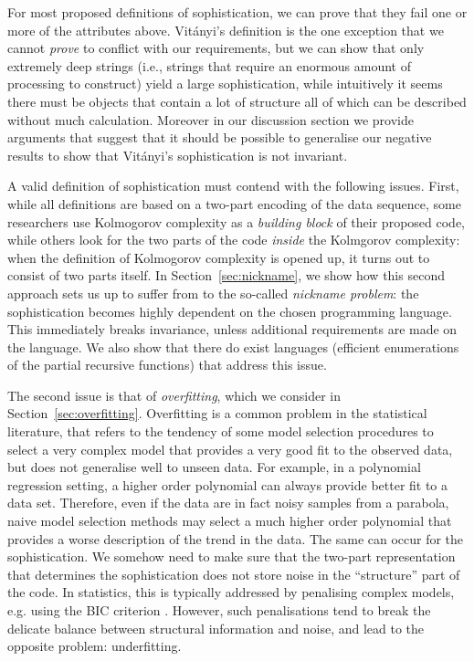 \documentclass{style/llncs}
\begin{document}
For most proposed definitions of sophistication, we can prove that they fail one or more of the attributes above. Vit\'anyi's definition \cite{TODO} is the one exception that we cannot \emph{prove} to conflict with our requirements, but we can show that only extremely deep strings (i.e., strings that require an enormous amount of processing to construct) yield a large sophistication, while intuitively it seems there must be objects that contain a lot of structure all of which can be described without much calculation. Moreover in our discussion section we provide arguments that suggest that it should be possible to generalise our negative results to show that Vit\'anyi's sophistication is not invariant.

A valid definition of sophistication must contend with the following issues. First, while all definitions are based on a two-part encoding of the data sequence, some researchers use Kolmogorov complexity as a \emph{building block} of their proposed code, while others look for the two parts of the code \emph{inside} the Kolmgorov complexity: when the definition of Kolmogorov complexity is opened up, it turns out to consist of two parts itself. In Section~\ref{sec:nickname}, we show how this second approach sets us up to suffer from to the so-called \emph{nickname problem}: the sophistication becomes highly dependent on the chosen programming language. This immediately breaks invariance, unless additional requirements are made on the language. We also show that there do exist languages (efficient enumerations of the partial recursive functions) that address this issue.

The second issue is that of \emph{overfitting}, which we consider in Section~\ref{sec:overfitting}. Overfitting is a common problem in the statistical literature, that refers to the tendency of some model selection procedures to select a very complex model that provides a very good fit to the observed data, but does not generalise well to unseen data. For example, in a polynomial regression setting, a higher order polynomial can always provide better fit to a data set. Therefore, even if the data are in fact noisy samples from a parabola, naive model selection methods may select a much higher order polynomial that provides a worse description of the trend in the data. The same can occur for the sophistication. We somehow need to make sure that the two-part representation that determines the sophistication does not store noise in the ``structure'' part of the code. In statistics, this is typically addressed by penalising complex models, e.g. using the BIC criterion \cite{TODO}. However, such penalisations tend to break the delicate balance between structural information and noise, and lead to the opposite problem: underfitting.
\end{document}
